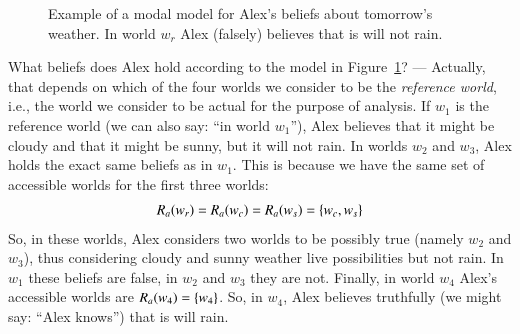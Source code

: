 \documentclass[nobib,nofonts]{tufte-handout}
\begin{document}
\begin{figure}
  \centering
  \caption{Example of a modal model for Alex's beliefs about tomorrow's weather. In world $w_{r}$ Alex (falsely) believes that is will not rain.}
  \label{fig:modal-model-single-agent}
\end{figure}

What beliefs does Alex hold according to the model in Figure~\ref{fig:modal-model-single-agent}? ---
Actually, that depends on which of the four worlds we consider to be the \emph{reference world}, i.e., the world we consider to be actual for the purpose of analysis.
If $w_{1}$ is the reference world (we can also say: ``in world $w_{1}$''), Alex believes that it might be cloudy and that it might be sunny, but it will not rain.
In worlds $w_{2}$ and $w_{3}$, Alex holds the exact same beliefs as in $w_{1}$.
This is because we have the same set of accessible worlds for the first three worlds:
\begin{align*}
  R_{a}(w_{r}) = R_{a}(w_{c}) = R_{a}(w_{s}) = \left\{w_{c}, w_{s}\right\}
\end{align*}
So, in these worlds, Alex considers two worlds to be possibly true (namely $w_{2}$ and $w_{3}$), thus considering cloudy and sunny weather live possibilities but not rain.
In $w_{1}$ these beliefs are false, in $w_{2}$ and $w_{3}$ they are not.
Finally, in world $w_{4}$ Alex's accessible worlds are $R_{a}(w_{4}) = \left\{w_{4}\right\}$.
So, in $w_{4}$, Alex believes truthfully (we might say: ``Alex knows'') that is will rain.
\end{document}

